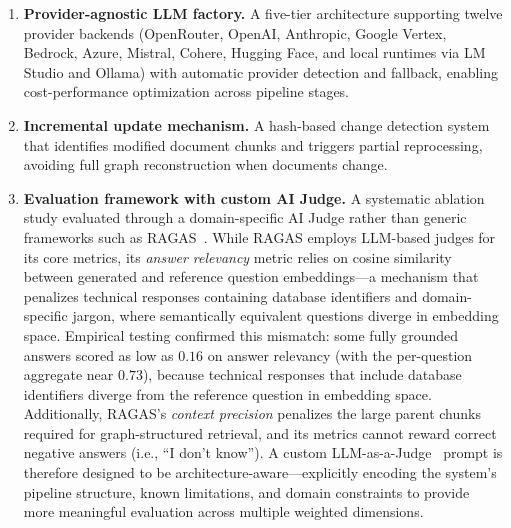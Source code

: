 \begin{enumerate}
    \item \textbf{Provider-agnostic LLM factory.} A five-tier architecture supporting twelve provider backends (OpenRouter, OpenAI, Anthropic, Google Vertex, Bedrock, Azure, Mistral, Cohere, Hugging Face, and local runtimes via LM Studio and Ollama) with automatic provider detection and fallback, enabling cost-performance optimization across pipeline stages.

    \item \textbf{Incremental update mechanism.} A hash-based change detection system that identifies modified document chunks and triggers partial reprocessing, avoiding full graph reconstruction when documents change.

    \item \textbf{Evaluation framework with custom AI Judge.} A systematic ablation study evaluated through a domain-specific AI Judge rather than generic frameworks such as RAGAS~\cite{es2025ragasautomatedevaluationretrieval}. While RAGAS employs LLM-based judges for its core metrics, its \emph{answer relevancy} metric relies on cosine similarity between generated and reference question embeddings---a mechanism that penalizes technical responses containing database identifiers and domain-specific jargon, where semantically equivalent questions diverge in embedding space. Empirical testing confirmed this mismatch: some fully grounded answers scored as low as $0.16$ on answer relevancy (with the per-question aggregate near $0.73$), because technical responses that include database identifiers diverge from the reference question in embedding space. Additionally, RAGAS's \emph{context precision} penalizes the large parent chunks required for graph-structured retrieval, and its metrics cannot reward correct negative answers (i.e., ``I don't know''). A custom LLM-as-a-Judge~\cite{zheng2023judgingllmasajudgemtbenchchatbot} prompt is therefore designed to be architecture-aware---explicitly encoding the system's pipeline structure, known limitations, and domain constraints to provide more meaningful evaluation across multiple weighted dimensions.
\end{enumerate}


